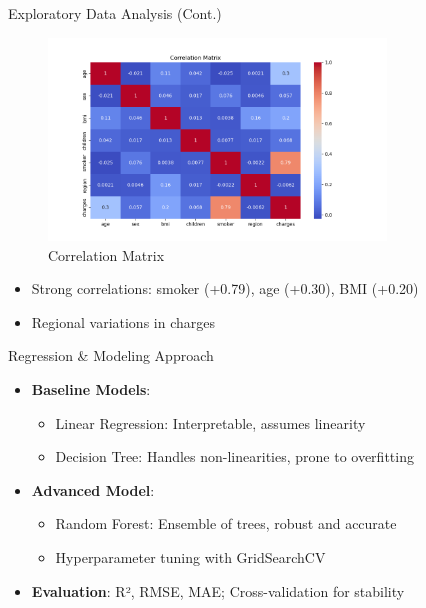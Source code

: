 \documentclass[10pt]{beamer}
\begin{document}
\begin{frame}{Exploratory Data Analysis (Cont.)}
\begin{figure}
\includegraphics[width=0.8\textwidth]{correlation_heatmap.png}
\caption{Correlation Matrix}
\end{figure}
\begin{itemize}
\item Strong correlations: smoker (+0.79), age (+0.30), BMI (+0.20)
\item Regional variations in charges
\end{itemize}
\end{frame}

\begin{frame}{Regression \& Modeling Approach}
\begin{itemize}
\item \textbf{Baseline Models}:
  \begin{itemize}
  \item Linear Regression: Interpretable, assumes linearity
  \item Decision Tree: Handles non-linearities, prone to overfitting
  \end{itemize}
\item \textbf{Advanced Model}:
  \begin{itemize}
  \item Random Forest: Ensemble of trees, robust and accurate
  \item Hyperparameter tuning with GridSearchCV
  \end{itemize}
\item \textbf{Evaluation}: R², RMSE, MAE; Cross-validation for stability
\end{itemize}
\end{frame}
\end{document}
